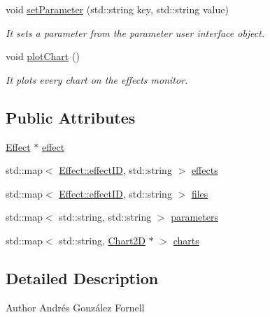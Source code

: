 \begin{DoxyCompactItemize}
void \hyperlink{class_effects_monitor_a96ff58c6076dd68e03aea26896b69d78}{set\+Parameter} (std\+::string key, std\+::string value)
\begin{DoxyCompactList}\small\item\em It sets a parameter from the parameter user interface object. \end{DoxyCompactList}\item 
\mbox{\label{class_effects_monitor_a50df1e2902fde1839b541b3429f8f02d}} 
void \hyperlink{class_effects_monitor_a50df1e2902fde1839b541b3429f8f02d}{plot\+Chart} ()
\begin{DoxyCompactList}\small\item\em It plots every chart on the effects monitor. \end{DoxyCompactList}\end{DoxyCompactItemize}
\subsection*{Public Attributes}
\begin{DoxyCompactItemize}
\item 
\hyperlink{class_effect}{Effect} $\ast$ \hyperlink{class_effects_monitor_a4ec98ceedd0d8bea006da1fc97f02124}{effect}
\item 
std\+::map$<$ \hyperlink{class_effect_a6422fe21e9e452943fbc3344884a6fed}{Effect\+::effect\+ID}, std\+::string $>$ \hyperlink{class_effects_monitor_abf43aed9b7bcc0dee032f5e2e6a3e438}{effects}
\item 
std\+::map$<$ \hyperlink{class_effect_a6422fe21e9e452943fbc3344884a6fed}{Effect\+::effect\+ID}, std\+::string $>$ \hyperlink{class_effects_monitor_a88dbd80c419f86e09919761011c2a152}{files}
\item 
std\+::map$<$ std\+::string, std\+::string $>$ \hyperlink{class_effects_monitor_aae2cb43d0ee0c182eca7309c561071ba}{parameters}
\item 
std\+::map$<$ std\+::string, \hyperlink{class_chart2_d}{Chart2D} $\ast$ $>$ \hyperlink{class_effects_monitor_a2b5f5373404adac3f94bdab2f423d958}{charts}
\end{DoxyCompactItemize}


\subsection{Detailed Description}
\begin{DoxyAuthor}{Author}
Andrés González Fornell 
\end{DoxyAuthor}


